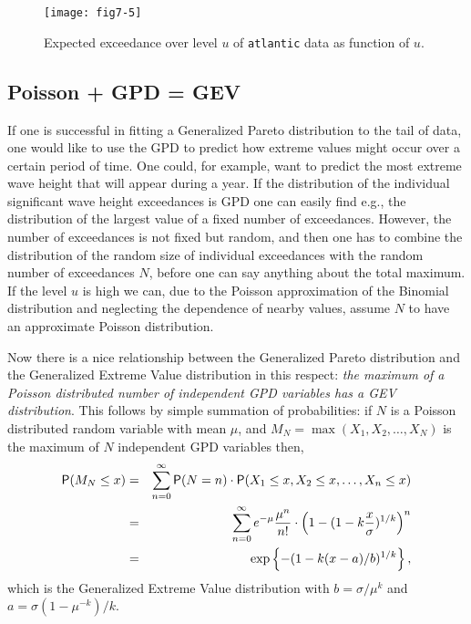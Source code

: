 \begin{figure}
  \centering
\texttt{[image: fig7-5]}
\vspace{-3mm}
  \caption[Estimated expected exceedance over level $u$]
{Expected exceedance over level $u$ of  {\tt atlantic} data
as function of $u$.}
  \label{fig7-5}
\end{figure}

\subsection{Poisson + GPD = GEV}
If one is successful in fitting a Generalized Pareto distribution to the
tail of data, one would like to use the GPD to predict how
extreme values might occur over a certain period of time. One could, 
for example, want to predict the most extreme wave height that will appear
 during a year. If the distribution of the individual significant wave
height exceedances is GPD one can easily find e.g., the
distribution of the largest value of a fixed number of exceedances.
However, the number of exceedances is not fixed but random, and
then one has to combine the distribution of the random size of
individual exceedances with the random number of exceedances $N$,
before
one can say anything about the total maximum. If the level
$u$ is high we can, due to the Poisson approximation of the Binomial
distribution and neglecting the dependence of nearby values, assume
$N$ to have an approximate Poisson distribution.

Now there is a nice relationship between the Generalized Pareto
distribution and the Generalized Extreme Value distribution in this
respect: {\it the maximum of a Poisson distributed number of independent
GPD variables has a GEV distribution}. This follows by simple
summation of probabilities: if $N$ is a Poisson distributed
random variable with mean ${\mu}$, and $M_{N} = \max (X_1, X_2,
\ldots, X_{N})$ is the maximum of $N$ independent GPD variables
then,
\begin{eqnarray*}
  \mbox{\sf P} (M_{N} \leq x) & = & \sum_{n=0}^{\infty} \mbox{\sf P} (N = n) \cdot
  \mbox{\sf P} (X_1 \leq x, X_2 \leq x, \ldots, X_n \leq x) \\
  & = & \sum_{n=0}^{\infty} e^{-{\mu}} \frac{{\mu}^n}{n!} \cdot
  \left( 1 - ( 1- k \frac{x}{{\sigma}})^{1/k}\right)^n \\
  & = & \exp \left\{- (1 - k(x-a)/b)^{1/k} \right\},
\end{eqnarray*}
which is the Generalized Extreme Value distribution with
$b={\sigma}/{\mu}^k$ and $a={\sigma}(1 - {\mu}^{-k})/k$.

